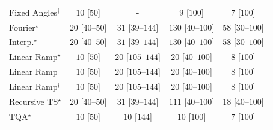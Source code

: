 \begin{tabular}{l|cccc|}
Fixed Angles$^\dagger$ & {\cellcolor[HTML]{F7FCF5}} \color[HTML]{000000} $10$ [$50$] & {\cellcolor[HTML]{000000}} \color[HTML]{F1F1F1} {\cellcolor{white}} \color{black} - & {\cellcolor[HTML]{F7FCF5}} \color[HTML]{000000} $9$ [$100$] & {\cellcolor[HTML]{F7FCF5}} \color[HTML]{000000} $7$ [$100$] \\
Fourier$^\star$ & {\cellcolor[HTML]{F5FBF2}} \color[HTML]{000000} $20$ [$40$--$50$] & {\cellcolor[HTML]{F3FAF0}} \color[HTML]{000000} $31$ [$39$--$144$] & {\cellcolor[HTML]{DFF3DA}} \color[HTML]{000000} $130$ [$40$--$100$] & {\cellcolor[HTML]{EFF9EB}} \color[HTML]{000000} $58$ [$30$--$100$] \\
Interp.$^\star$ & {\cellcolor[HTML]{F5FBF2}} \color[HTML]{000000} $20$ [$40$--$50$] & {\cellcolor[HTML]{F3FAF0}} \color[HTML]{000000} $31$ [$39$--$144$] & {\cellcolor[HTML]{DFF3DA}} \color[HTML]{000000} $130$ [$40$--$100$] & {\cellcolor[HTML]{EFF9EB}} \color[HTML]{000000} $58$ [$30$--$100$] \\
Linear Ramp$^\star$ & {\cellcolor[HTML]{F7FCF5}} \color[HTML]{000000} $10$ [$50$] & {\cellcolor[HTML]{F5FBF2}} \color[HTML]{000000} $20$ [$105$--$144$] & {\cellcolor[HTML]{F5FBF2}} \color[HTML]{000000} $20$ [$40$--$100$] & {\cellcolor[HTML]{F7FCF5}} \color[HTML]{000000} $8$ [$100$] \\
Linear Ramp & {\cellcolor[HTML]{F7FCF5}} \color[HTML]{000000} $10$ [$50$] & {\cellcolor[HTML]{F5FBF2}} \color[HTML]{000000} $20$ [$105$--$144$] & {\cellcolor[HTML]{F5FBF2}} \color[HTML]{000000} $20$ [$40$--$100$] & {\cellcolor[HTML]{F7FCF5}} \color[HTML]{000000} $8$ [$100$] \\
Linear Ramp$^\dagger$ & {\cellcolor[HTML]{F7FCF5}} \color[HTML]{000000} $10$ [$50$] & {\cellcolor[HTML]{F5FBF2}} \color[HTML]{000000} $20$ [$105$--$144$] & {\cellcolor[HTML]{F5FBF2}} \color[HTML]{000000} $20$ [$40$--$100$] & {\cellcolor[HTML]{F7FCF5}} \color[HTML]{000000} $8$ [$100$] \\
Recursive TS$^\star$ & {\cellcolor[HTML]{F5FBF2}} \color[HTML]{000000} $20$ [$40$--$50$] & {\cellcolor[HTML]{F3FAF0}} \color[HTML]{000000} $31$ [$39$--$144$] & {\cellcolor[HTML]{E5F5E0}} \color[HTML]{000000} $111$ [$40$--$100$] & {\cellcolor[HTML]{F5FBF3}} \color[HTML]{000000} $18$ [$40$--$100$] \\
TQA$^\star$ & {\cellcolor[HTML]{F7FCF5}} \color[HTML]{000000} $10$ [$50$] & {\cellcolor[HTML]{F7FCF5}} \color[HTML]{000000} $10$ [$144$] & {\cellcolor[HTML]{F7FCF5}} \color[HTML]{000000} $10$ [$100$] & {\cellcolor[HTML]{F7FCF5}} \color[HTML]{000000} $7$ [$100$] \\

\end{tabular}
